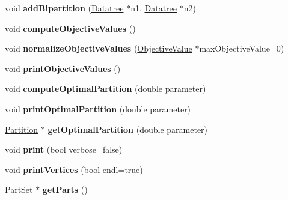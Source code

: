 \begin{DoxyCompactItemize}
\item 
\hypertarget{classDatatree_a80edf7e5f07d5a06380d33d15d4c283e}{void {\bfseries add\-Bipartition} (\hyperlink{classDatatree}{Datatree} $\ast$n1, \hyperlink{classDatatree}{Datatree} $\ast$n2)}\label{classDatatree_a80edf7e5f07d5a06380d33d15d4c283e}

\item 
\hypertarget{classDatatree_a7ae2c6a5ca9d09767a6db92a2637ef56}{void {\bfseries compute\-Objective\-Values} ()}\label{classDatatree_a7ae2c6a5ca9d09767a6db92a2637ef56}

\item 
\hypertarget{classDatatree_a4cdd6b4b682af74478fc2b760816633b}{void {\bfseries normalize\-Objective\-Values} (\hyperlink{classObjectiveValue}{Objective\-Value} $\ast$max\-Objective\-Value=0)}\label{classDatatree_a4cdd6b4b682af74478fc2b760816633b}

\item 
\hypertarget{classDatatree_a7308791f14c13557f0d933c45e67cd8f}{void {\bfseries print\-Objective\-Values} ()}\label{classDatatree_a7308791f14c13557f0d933c45e67cd8f}

\item 
\hypertarget{classDatatree_a5e0d20a09169c369fd327e88101835dd}{void {\bfseries compute\-Optimal\-Partition} (double parameter)}\label{classDatatree_a5e0d20a09169c369fd327e88101835dd}

\item 
\hypertarget{classDatatree_a69d5034cf5a9d1a7af3d2213c93893cd}{void {\bfseries print\-Optimal\-Partition} (double parameter)}\label{classDatatree_a69d5034cf5a9d1a7af3d2213c93893cd}

\item 
\hypertarget{classDatatree_a0dcbcdce7d54262fff6cebb95783e557}{\hyperlink{classPartition}{Partition} $\ast$ {\bfseries get\-Optimal\-Partition} (double parameter)}\label{classDatatree_a0dcbcdce7d54262fff6cebb95783e557}

\item 
\hypertarget{classDatatree_a1a2db65768a7bccb3a2b526dc0cf5209}{void {\bfseries print} (bool verbose=false)}\label{classDatatree_a1a2db65768a7bccb3a2b526dc0cf5209}

\item 
\hypertarget{classDatatree_a351a7f2726c47274b0a227562f6b8978}{void {\bfseries print\-Vertices} (bool endl=true)}\label{classDatatree_a351a7f2726c47274b0a227562f6b8978}

\item 
\hypertarget{classDatatree_adfb6a2a5705f553b0ee94544849fe53c}{Part\-Set $\ast$ {\bfseries get\-Parts} ()}\label{classDatatree_adfb6a2a5705f553b0ee94544849fe53c}


\end{DoxyCompactItemize}

